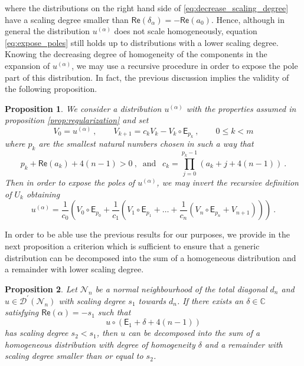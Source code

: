 \documentclass[11pt]{book}
\renewcommand{\Re}{\mathsf{Re}}
\newcommand{\Dcal}{\mathcal{D}}
\newcommand{\Ncal}{\mathcal{N}}
\newcommand{\Cbb}{\mathbb{C}}
\newcommand{\Esf}{\mathsf{E}}
\theoremstyle{break}
\newtheorem{proposition}{Proposition}[chapter]
\begin{document}
%
where the distributions on the right hand side of \eqref{eq:decrease_scaling_degree} have a scaling degree smaller than $\Re(\delta_\alpha) = - \Re (a_0)$. Hence, although in general the distribution $u^{(\alpha)}$ does not scale homogeneously, equation \eqref{eq:expose_poles} still holds up to distributions with a lower scaling degree. Knowing the decreasing degree of homogeneity of the components in the expansion of $u^{(\alpha)}$, we may use a recursive procedure in order to expose the pole part of this distribution. In fact, the previous discussion implies the validity of the following proposition.


\begin{proposition}\label{prop:expose_poles}
We consider a distribution $u^{(\alpha)}$ with the properties assumed in proposition \ref{prop:regularization} and set
%
\begin{equation*}
V_0 = u^{(\alpha)} \ , \qquad V_{k+1} = c_k V_k - V_k \circ \Esf_{p_k} \ , \qquad 0 \leq k < m 
\end{equation*}
%
where $p_k$ are the smallest natural numbers chosen in such a way that 
%
\begin{equation*}
p_k+\Re(a_k)+4(n-1)>0 \ , \ \mbox{ and } \ \ c_k = \prod_{j=0}^{p_k-1} \left(a_k+j+4(n-1)\right) \ .
\end{equation*}
%
Then in order to expose the poles of $u^{(\alpha)}$, we may invert the recursive definition of $U_k$ obtaining
%
\begin{equation*}
u^{(\alpha)} = \frac{1}{c_0} \left( V_0\circ \Esf_{p_0} +  \frac{1}{c_1} \left( V_1 \circ \Esf_{p_1} +\dots + \frac{1}{c_n} \left( V_n \circ \Esf_{p_n} + V_{n+1} \right) \right) \right) \ .
\end{equation*}
%
\end{proposition}


In order to be able use the previous results for our purposes, we provide in the next proposition a criterion which is sufficient to ensure that a generic distribution can be decomposed into the sum of a homogeneous distribution and a remainder with lower scaling degree. 


\begin{proposition}\label{prop:set}
Let $\Ncal_n$ be a normal neighbourhood of the total diagonal $d_n$ and $u \in \Dcal^\prime(\Ncal_n)$ with scaling degree $s_1$ towards $d_n$. If there exists an $\delta\in\Cbb$ satisfying $\Re(\alpha)=-s_1$ such that
%
\begin{equation*}
u\circ(\Esf_1+\delta+4(n-1)) 
\end{equation*}
%
has scaling degree $s_2 < s_1$, then $u$ can be decomposed into the sum of a homogeneous distribution with degree of homogeneity $\delta$ and a remainder with scaling degree smaller than or equal to $s_2$.
\end{proposition}
\end{document}

